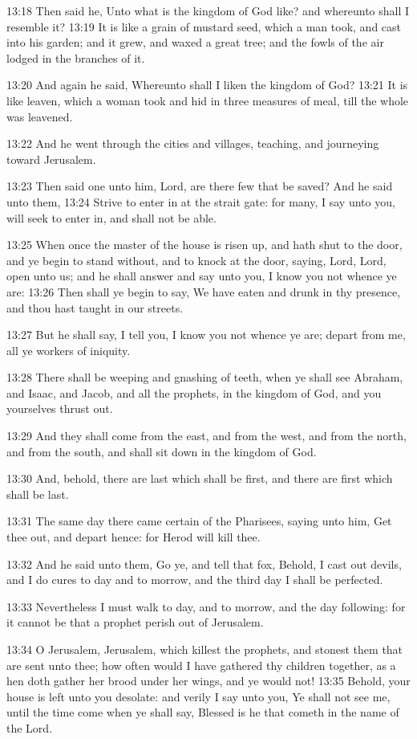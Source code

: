 13:18 Then said he, Unto what is the kingdom of God like? and whereunto shall I resemble it?  13:19 It is like a grain of mustard seed, which a man took, and cast into his garden; and it grew, and waxed a great tree; and the fowls of the air lodged in the branches of it.

13:20 And again he said, Whereunto shall I liken the kingdom of God?  13:21 It is like leaven, which a woman took and hid in three measures of meal, till the whole was leavened.

13:22 And he went through the cities and villages, teaching, and journeying toward Jerusalem.

13:23 Then said one unto him, Lord, are there few that be saved? And he said unto them, 13:24 Strive to enter in at the strait gate: for many, I say unto you, will seek to enter in, and shall not be able.

13:25 When once the master of the house is risen up, and hath shut to the door, and ye begin to stand without, and to knock at the door, saying, Lord, Lord, open unto us; and he shall answer and say unto you, I know you not whence ye are: 13:26 Then shall ye begin to say, We have eaten and drunk in thy presence, and thou hast taught in our streets.

13:27 But he shall say, I tell you, I know you not whence ye are; depart from me, all ye workers of iniquity.

13:28 There shall be weeping and gnashing of teeth, when ye shall see Abraham, and Isaac, and Jacob, and all the prophets, in the kingdom of God, and you yourselves thrust out.

13:29 And they shall come from the east, and from the west, and from the north, and from the south, and shall sit down in the kingdom of God.

13:30 And, behold, there are last which shall be first, and there are first which shall be last.

13:31 The same day there came certain of the Pharisees, saying unto him, Get thee out, and depart hence: for Herod will kill thee.

13:32 And he said unto them, Go ye, and tell that fox, Behold, I cast out devils, and I do cures to day and to morrow, and the third day I shall be perfected.

13:33 Nevertheless I must walk to day, and to morrow, and the day following: for it cannot be that a prophet perish out of Jerusalem.

13:34 O Jerusalem, Jerusalem, which killest the prophets, and stonest them that are sent unto thee; how often would I have gathered thy children together, as a hen doth gather her brood under her wings, and ye would not!  13:35 Behold, your house is left unto you desolate: and verily I say unto you, Ye shall not see me, until the time come when ye shall say, Blessed is he that cometh in the name of the Lord.

